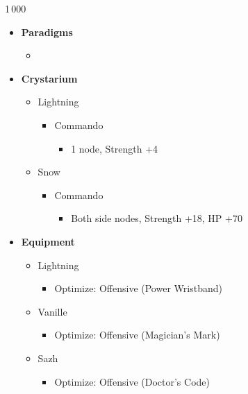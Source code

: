\begin{multicols}{2}
\begin{shop}{1\,000}
\begin{itemize}
\begin{itemize}
\begin{itemize}
        \end{itemize}
    \end{itemize}
\end{itemize}
\end{shop}
\begin{menu}
\begin{itemize}
    \item \textbf{Paradigms}
    \begin{itemize}
        \item {}%
{\paradigmline{(\rav)}{\rav}{\rav}}%
{\paradigmline{\com}{\sen}{\med}}%
{\paradigmline[3]{\textit{[\com]}}{\textit{\com}}{\textit{\rav}}}%
{\paradigmline{[\com]}{\com}{\rav}}
    \end{itemize}
    \item \textbf{Crystarium}
    \begin{itemize}
        \item Lightning
        \begin{itemize}
            \item Commando
            \begin{itemize}
                \item 1 node, Strength +4
            \end{itemize}
        \end{itemize}
        \item Snow
        \begin{itemize}
            \item Commando
            \begin{itemize}
                \item Both side nodes, Strength +18, HP +70
            \end{itemize}
        \end{itemize}
    \end{itemize}
    
    \item \textbf{Equipment}
    \begin{itemize}
        \item Lightning
        \begin{itemize}
            \item Optimize: Offensive (Power Wristband)
        \end{itemize}
        \item Vanille
        \begin{itemize}
            \item Optimize: Offensive (Magician's Mark)
        \end{itemize}
        \item Sazh
        \begin{itemize}
            \item Optimize: Offensive (Doctor's Code)
        \end{itemize}
    \end{itemize}
\end{itemize}
\end{menu}
\vfill
\renewcommand{\first}{[1] Tri-Disaster (\rav/\rav/\rav)}


\end{multicols}

